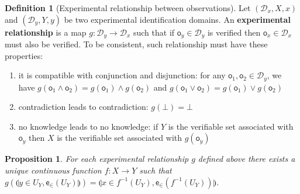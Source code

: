 \documentclass[review]{elsarticle}
\theoremstyle{plain}%
\newtheorem{prop}[thm]{Proposition}
\theoremstyle{definition}
\newtheorem{defn}{Definition}[section]
\theoremstyle{remark}
\begin{document}
\begin{defn}[Experimental relationship between observations]
	Let $(\mathcal{D}_x, X, x)$ and $(\mathcal{D}_y, Y, y)$ be two experimental identification domains. An \textbf{experimental relationship} is a map $g : \mathcal{D}_y \rightarrow \mathcal{D}_x$ such that if $\mathsf{o}_y \in \mathcal{D}_y$ is verified then $\mathsf{o}_x \in \mathcal{D}_x$ must also be verified. To be consistent, such relationship must have these properties:
	\begin{enumerate}
	\item it is compatible with conjunction and disjunction: for any $\mathsf{o}_1, \mathsf{o}_2 \in \mathcal{D}_y$, we have $g(\mathsf{o}_1 \wedge \mathsf{o}_2)=g(\mathsf{o}_1)\wedge g(\mathsf{o}_2)$ and $g(\mathsf{o}_1 \vee \mathsf{o}_2)=g(\mathsf{o}_1)\vee g(\mathsf{o}_2)$
	\item contradiction leads to contradiction: $g(\bot) = \bot$
	\item no knowledge leads to no knowledge: if $Y$ is the verifiable set associated with $\mathsf{o}_y$ then $X$ is the verifiable set associated with  $g(\mathsf{o}_y)$
	\end{enumerate}
\end{defn}

\begin{prop}
	For each experimental relationship $g$ defined above there exists a unique continuous function $f: X \rightarrow Y$ such that $g(\llparenthesis y\in U_Y,\mathsf{e}_{\in}(U_Y)\rrparenthesis) = \llparenthesis x\in f^{-1}(U_Y),\mathsf{e}_{\in}(f^{-1}(U_Y))\rrparenthesis$.
\end{prop}
\end{document}
